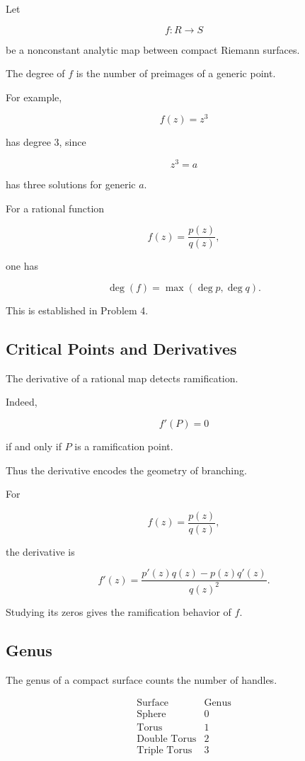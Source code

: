 \documentclass[12pt,a4paper]{article}
\theoremstyle{notespace}
\begin{document}
Let

\[
f:R\to S
\]

be a nonconstant analytic map between compact Riemann surfaces.

The degree of \(f\) is the number of preimages of a generic point.

For example,

\[
f(z)=z^3
\]

has degree \(3\), since

\[
z^3=a
\]

has three solutions for generic \(a\).

For a rational function

\[
f(z)=\frac{p(z)}{q(z)},
\]

one has

\[
\deg(f)
=
\max(\deg p,\deg q).
\]

This is established in Problem 4.

\subsection{Critical Points and Derivatives}

The derivative of a rational map detects ramification.

Indeed,

\[
f'(P)=0
\]

if and only if \(P\) is a ramification point.

Thus the derivative encodes the geometry of branching.

For

\[
f(z)=\frac{p(z)}{q(z)},
\]

the derivative is

\[
f'(z)
=
\frac{p'(z)q(z)-p(z)q'(z)}
{q(z)^2}.
\]

Studying its zeros gives the ramification behavior of \(f\).

\subsection{Genus}

The genus of a compact surface counts the number of handles.

\[
\begin{array}{c|c}
	\text{Surface} & \text{Genus} \\
	\hline
	\text{Sphere} & 0 \\
	\text{Torus} & 1 \\
	\text{Double Torus} & 2 \\
	\text{Triple Torus} & 3
\end{array}
\]
\end{document}
